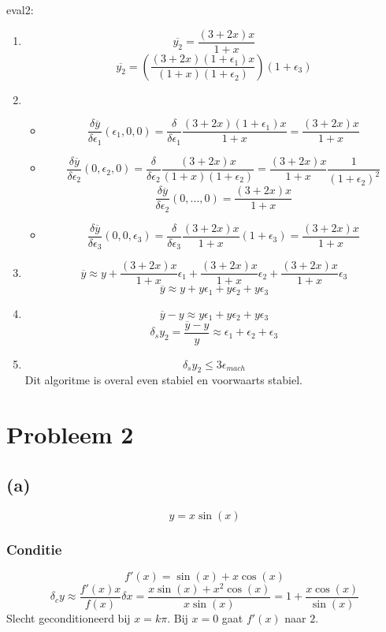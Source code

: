 \documentclass[12pt,a4paper]{article}
\begin{document}
eval2:
\begin{enumerate}
\item
\[
\overline{y_2}=
\frac{(3+2x)x}{1+x}
\]
\[
\overline{y_2} = \left(\frac{(3+2x)(1+\epsilon_1)x}{(1+x)(1+\epsilon_2)}\right)(1+\epsilon_3)
\]


\item
\begin{itemize}
\item
\[
\frac{\delta\overline{y}}{\delta\epsilon_1}(\epsilon_1,0,0)
= \frac{\delta}{\delta\epsilon_1}\frac{(3+2x)(1+\epsilon_1)x}{1+x}
= \frac{(3+2x)x}{1+x}
\]

\item
\[
\frac{\delta\overline{y}}{\delta\epsilon_2}(0,\epsilon_2,0)
= \frac{\delta}{\delta\epsilon_2}\frac{(3+2x)x}{(1+x)(1+\epsilon_2)}
= \frac{(3+2x)x}{1+x}\frac{1}{(1+\epsilon_2)^2}
\]
\[
\frac{\delta\overline{y}}{\delta\epsilon_2}(0,...,0)
= \frac{(3+2x)x}{1+x}
\]

\item
\[
\frac{\delta\overline{y}}{\delta\epsilon_3}(0,0,\epsilon_3)
= \frac{\delta}{\delta\epsilon_3}\frac{(3+2x)x}{1+x}(1+\epsilon_3)
= \frac{(3+2x)x}{1+x}
\]

\end{itemize}
\item
\[
\overline{y} \approx y
+ \frac{(3+2x)x}{1+x}\epsilon_1
+ \frac{(3+2x)x}{1+x}\epsilon_2
+ \frac{(3+2x)x}{1+x}\epsilon_3
\]
\[
\overline{y} \approx y
+ y\epsilon_1
+ y\epsilon_2
+ y\epsilon_3
\]

\item
\[
\overline{y} - y
\approx
  y\epsilon_1
+ y\epsilon_2
+ y\epsilon_3
\]
\[
\delta_{s}y_2
= \frac{\overline{y} - y}{y}
\approx
  \epsilon_1
+ \epsilon_2
+ \epsilon_3
\]
\item
\[
\delta_{s}y_2 \le  3\epsilon_{mach}
\]
Dit algoritme is overal even stabiel en voorwaarts stabiel.
\end{enumerate}


\section{Probleem 2}
\subsection*{(a)}
\[
y = x\sin(x)
\]

\subsubsection*{Conditie}
\[
f'(x) = \sin(x) + x\cos(x)
\]
\[
\delta_cy \approx \frac{f'(x)x}{f(x)}\delta x
= \frac{x\sin(x) + x^2\cos(x)}{x\sin(x)}
= 1+\frac{x\cos(x)}{\sin(x)}
\]
Slecht geconditioneerd bij $x=k\pi$.
Bij $x=0$ gaat $f'(x)$ naar $2$.
\end{document}
